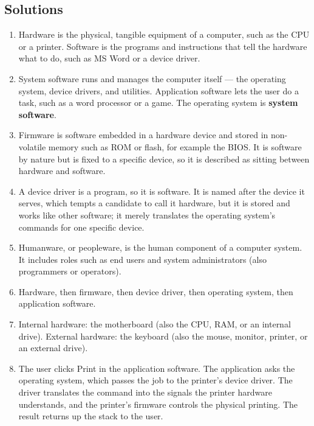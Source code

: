 \subsection*{Solutions}
\begingroup\small
\begin{enumerate}[label=\arabic*.]
  \item Hardware is the physical, tangible equipment of a computer, such as
    the CPU or a printer. Software is the programs and instructions that tell
    the hardware what to do, such as MS Word or a device driver.
  \item System software runs and manages the computer itself --- the operating
    system, device drivers, and utilities. Application software lets the user
    do a task, such as a word processor or a game. The operating system is
    \textbf{system software}.
  \item Firmware is software embedded in a hardware device and stored in
    non-volatile memory such as ROM or flash, for example the BIOS. It is
    software by nature but is fixed to a specific device, so it is described
    as sitting between hardware and software.
  \item A device driver is a program, so it is software. It is named after the
    device it serves, which tempts a candidate to call it hardware, but it is
    stored and works like other software; it merely translates the operating
    system's commands for one specific device.
  \item Humanware, or peopleware, is the human component of a computer system.
    It includes roles such as end users and system administrators (also
    programmers or operators).
  \item Hardware, then firmware, then device driver, then operating system,
    then application software.
  \item Internal hardware: the motherboard (also the CPU, RAM, or an internal
    drive). External hardware: the keyboard (also the mouse, monitor, printer,
    or an external drive).
  \item The user clicks Print in the application software. The application
    asks the operating system, which passes the job to the printer's device
    driver. The driver translates the command into the signals the printer
    hardware understands, and the printer's firmware controls the physical
    printing. The result returns up the stack to the user.
\end{enumerate}
\endgroup

